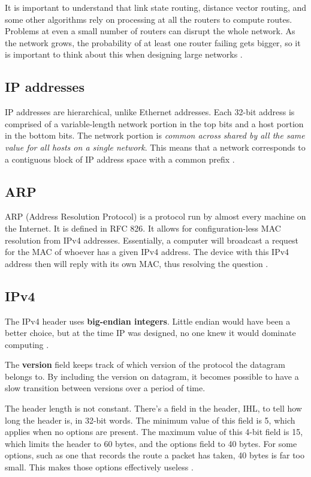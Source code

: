 \documentclass[12pt, oneside]{book}
\begin{document}
It is important to understand that link state routing, distance vector routing, and some other algorithms rely on processing at all the routers to compute routes. Problems at even a small number of routers can disrupt the whole network. As the network grows, the probability of at least one router failing gets bigger, so it is important to think about this when designing large networks \cite[p.~378]{computer-networks-tanenbaum-2012}.

\subsection{IP addresses}

IP addresses are hierarchical, unlike Ethernet addresses. Each 32-bit address is comprised of a variable-length network portion in the top bits and a host portion in the bottom bits.
The network portion is \emph{common across shared by all the same value for all hosts on a single network}.
This means that a network corresponds to a contiguous block of IP address space with a common prefix \cite{computer-networks-tanenbaum-2012}.

\subsection{ARP}

ARP (Address Resolution Protocol) is a protocol run by almost every machine on the Internet. It is defined in RFC
826. It allows for configuration-less MAC resolution from IPv4 addresses. Essentially, a computer will broadcast a request for the MAC of whoever has a given IPv4 address. The device with this IPv4 address then will reply with its own MAC, thus resolving the question \cite{computer-networks-tanenbaum-2012}.

\subsection{IPv4}

The IPv4 header uses \textbf{big-endian integers}. Little endian would have been a better choice, but at the time IP was designed, no one knew it would dominate computing \cite{computer-networks-tanenbaum-2012}.

The \textbf{version} field keeps track of which version of the protocol the datagram belongs to. By including the version on datagram, it becomes possible to have a slow transition between versions over a period of time.

The header length is not constant. There's a field in the header, IHL, to tell how long the header is, in 32-bit words. The minimum value of this field is 5, which applies when no options are present.
The maximum value of this 4-bit field is 15, which limits the header to 60 bytes, and the options field to 40 bytes. For some options, such as one that records the route a packet has taken, 40 bytes is far too small.
This makes those options effectively useless \cite{computer-networks-tanenbaum-2012}.
\end{document}

